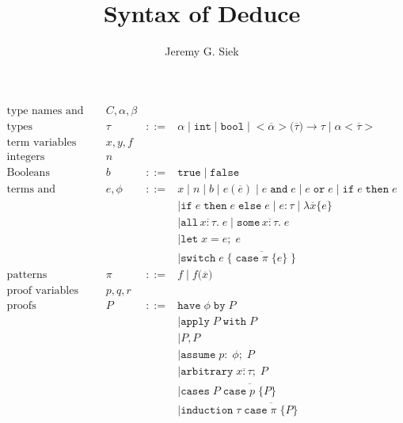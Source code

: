 \documentclass{article}
\title{Syntax of Deduce}
\author{Jeremy G. Siek}
\newcommand{\LC}{\texttt{\{}}
\newcommand{\RC}{\texttt{\}}}
\newcommand{\LP}{\texttt{(}}
\newcommand{\RP}{\texttt{)}}
\begin{document}
\maketitle

\[
\begin{array}{lrcl}
  \text{type names and variables} & C,\alpha,\beta \\
  \text{types}& \tau & ::= & \alpha \mid \mathtt{int} \mid \mathtt{bool}
  \mid \mathtt{<} \overline{\alpha} \mathtt{>} \LP \overline{\tau} \RP \to \tau
  \mid \alpha \mathtt{<} \overline{\tau} \mathtt{>} \\
  \text{term variables} & x,y,f \\
  \text{integers} & n \\
  \text{Booleans} & b & ::= & \mathtt{true} \mid \mathtt{false}\\
  \text{terms and formulas} & e,\phi &::= & x \mid n \mid b \mid e(\overline{e}) \mid e \mathop{\mathtt{and}} e
    \mid e \mathop{\mathtt{or}} e \mid \mathtt{if}\; e \;\mathtt{then}\; e\\
    &&& \mid \mathtt{if}\; e \;\mathtt{then}\; e \;\mathtt{else}\;e
    \mid e \mathop{\mathtt{:}} \tau \mid \lambda \overline{x} \LC e \RC  \\
    &&& \mid \mathtt{all}\, \overline{x \mathop{\mathtt{:}} \tau} \mathtt{.}\; e 
    \mid \mathtt{some}\, \overline{x \mathop{\mathtt{:}} \tau} \mathtt{.}\; e \\
    &&& \mid \mathtt{let}\; x \mathop{\mathtt{=}} e \mathtt{;}\; e \\
    &&& \mid \mathtt{switch}\;e\; \LC \; \overline{\mathtt{case}\; \pi\; \LC e \RC} \; \RC\\
  \text{patterns} & \pi & ::= & f \mid f \LP \overline{x} \RP \\
  \text{proof variables} & p,q,r \\
  \text{proofs} & P & ::= & \mathtt{have}\; \phi \; \mathtt{by} \; P \\
      & & & \mid \mathtt{apply}\; P \;\mathtt{with} \; P \\
      & & & \mid P \mathop{\mathtt{,}} P \\
      & & & \mid \mathtt{assume}\; p \mathtt{:}\; \phi \mathtt{;}\; P \\
  & & & \mid \mathtt{arbitrary}\; \overline{x \mathtt{:}\tau} \mathtt{;}\; P \\
  & & & \mid \mathtt{cases} \; P\; \overline{\mathtt{case}\; p\; \LC P \RC} \\
  & & & \mid \mathtt{induction} \; \tau\; \overline{\mathtt{case}\;\pi \; \LC P\RC} \\

\end{array}\]
\end{document}
